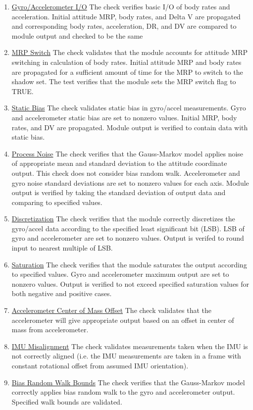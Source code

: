 \begin{enumerate}
	\item \underline{Gyro/Accelerometer I/O} The check verifies basic I/O of body rates and acceleration. Initial attitude MRP, body rates, and Delta V are propagated and corresponding body rates, acceleration, DR, and DV are compared to module output and checked to be the same
	\item \underline{MRP Switch} The check validates that the module accounts for attitude MRP switching in calculation of body rates. Initial attitude MRP and body rates are propagated for a sufficient amount of time for the MRP to switch to the shadow set. The test verifies that the module sets the MRP switch flag to TRUE.
	\item \underline{Static Bias} The check validates static bias in gyro/accel measurements. Gyro and accelerometer static bias are set to nonzero values. Initial MRP, body rates, and DV are propagated. Module output is verified to contain data with static bias.
	\item \underline{Process Noise} The check verifies that the Gauss-Markov model applies noise of appropriate mean and standard deviation to the attitude coordinate output. This check does not consider bias random walk. Accelerometer and gyro noise standard deviations are set to nonzero values for each axis. Module output is verified by taking the standard deviation of output data and comparing to specified values.
	\item \underline{Discretization} The check verifies that the module correctly discretizes the gyro/accel data according to the specified least significant bit (LSB). LSB of gyro and accelerometer are set to nonzero values. Output is verifed to round input to nearest multiple of LSB.
	\item \underline{Saturation} The check verifies that the module saturates the output according to specified values. Gyro and accelerometer maximum output are set to nonzero values. Output is verified to not exceed specified saturation values for both negative and positive cases.
	\item \underline{Accelerometer Center of Mass Offset} The check validates that the accelerometer will give appropriate output based on an offset in center of mass from accelerometer.
	\item \underline{IMU Misalignment} The check validates measurements taken when the IMU is not correctly aligned (i.e. the IMU measurements are taken in a frame with constant rotational offset from assumed IMU orientation).
	\item \underline{Bias Random Walk Bounds} The check verifies that the Gauss-Markov model correctly applies bias random walk to the gyro and accelerometer output. Specified walk bounds are validated.
\end{enumerate} 


